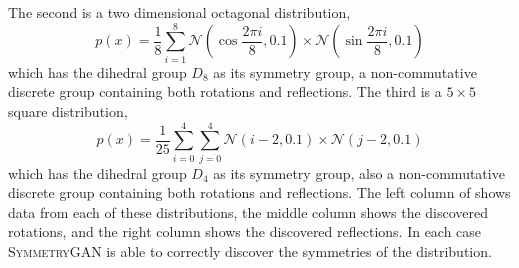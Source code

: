                 The second is a two dimensional octagonal distribution,
                \[
                    p(x) = \frac{1}{8}\sum_{i=1}^{8} \mathcal{N}(\cos\frac{2\pi i}{8}, 0.1)\times \mathcal{N}(\sin\frac{2\pi i}{8}, 0.1)
                \]
                which has the dihedral group \(D_8\) as its symmetry group, a non-commutative discrete group containing both rotations and reflections.
                The third is a \(5\times 5\) square distribution,
                \[
                    p(x) = \frac{1}{25}\sum_{i=0}^{4}\sum_{j=0}^{4} \mathcal{N}(i-2, 0.1)\times \mathcal{N}(j-2, 0.1)
                \]
                which has the dihedral group \(D_4\) as its symmetry group, also a non-commutative discrete group containing both rotations and reflections.
                The left column of  shows data from each of these distributions, the middle column shows the discovered rotations, and the right column shows the discovered reflections.
                In each case \textsc{SymmetryGAN} is able to correctly discover the symmetries of the distribution.

